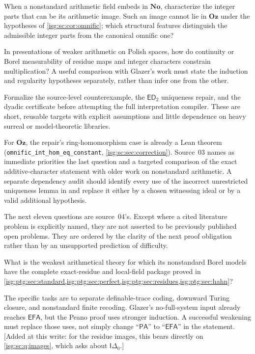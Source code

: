 \documentclass[11pt]{article}
\theoremstyle{definition}
\theoremstyle{remark}
\newcommand{\No}{\ensuremath{\mathbf{No}}}
\newcommand{\Oz}{\ensuremath{\mathbf{Oz}}}
\newcommand{\ED}{\mathsf{ED}}
\newcommand{\Idelta}{\mathsf{I}\Delta_0}
\newcommand{\PA}{\mathsf{PA}}
\newcommand{\EFA}{\mathsf{EFA}}
\newcommand{\fn}[1]{\nolinkurl{#1}}
\begin{document}
\begin{question}\label{isg:sc:q:integerparts}
When a nonstandard arithmetic field embeds in $\No$, characterize the
integer parts that can be its arithmetic image. Such an image cannot lie
in $\Oz$ under the hypotheses of \cref{isg:sc:cor:omnific}; which
structural features distinguish the admissible integer parts from the
canonical omnific one?
\end{question}

\begin{question}\label{isg:sc:q:regularity}
In presentations of weaker arithmetic on Polish spaces, how do continuity
or Borel measurability of residue maps and integer characters constrain
multiplication? A useful comparison with Glazer's work must state the
induction and regularity hypotheses separately, rather than infer one from
the other.
\end{question}

\begin{question}\label{isg:sc:q:milestone}
Formalize the source-level counterexample, the $\ED_2$ uniqueness repair,
and the dyadic certificate before attempting the full interpretation
compiler. These are short, reusable targets with explicit assumptions and
little dependence on heavy surreal or model-theoretic libraries.
\end{question}
For $\Oz$, the repair's ring-homomorphism case is already a Lean theorem
(\fn{omnific_int_hom_eq_constant}, \cref{isg:sc:sec:correction}).
Source~03 names as immediate priorities the last question and a targeted
comparison of the exact additive-character statement with older work on
nonstandard arithmetic. A separate dependency audit should identify every
use of the incorrect unrestricted uniqueness lemma in \cite{ELV} and
replace it either by a chosen witnessing ideal or by a valid additional
hypothesis.

The next eleven questions are source~04's. Except where a cited literature
problem is explicitly named, they are not asserted to be previously
published open problems. They are ordered by the clarity of the next proof
obligation rather than by an unsupported prediction of difficulty.

\begin{question}\label{isg:ptg:q:weaker}
What is the weakest arithmetical theory for which its nonstandard Borel
models have the complete exact-residue and local-field package proved in
\cref{isg:ptg:sec:standard,isg:ptg:sec:perfect,isg:ptg:sec:residues,isg:ptg:sec:hahn}?
\end{question}
The specific tasks are to separate definable-trace coding, downward Turing
closure, and nonstandard finite recoding. Glazer's no-full-system input
already reaches $\EFA$, but the Peano proof uses stronger induction. A
successful weakening must replace those uses, not simply change ``$\PA$''
to ``$\EFA$'' in the statement. \textup{[}Added at this write: for the residue images, this
bears directly on \cref{isg:sc:q:images}, which asks about
$\Idelta$.\textup{]}
\end{document}
